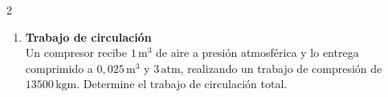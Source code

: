 \documentclass[a4paper,12pt]{article}
\begin{document}
\begin{multicols}{2}
\begin{enumerate}
\vspace{0.3cm}

\item \textbf{Trabajo de circulación} \\
Un compresor recibe $1\,\text{m}^3$ de aire a presión atmosférica y lo entrega comprimido a $0{,}025\,\text{m}^3$ y $3\,\text{atm}$, realizando un trabajo de compresión de $13500\,\text{kgm}$. Determine el trabajo de circulación total.

\end{enumerate}

\end{multicols}
\end{document}
